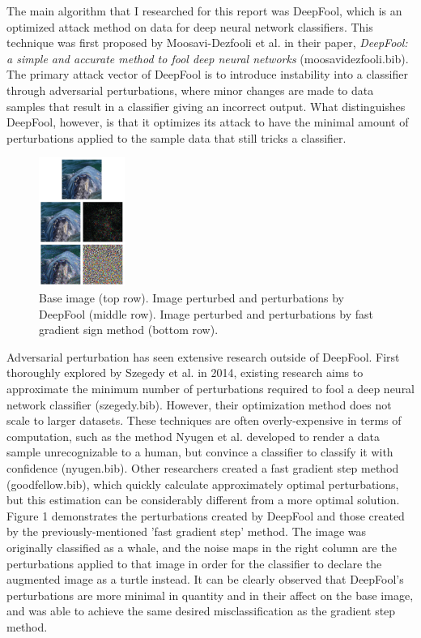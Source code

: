 \documentclass[../article.tex]{subfiles}
\begin{document}
The main algorithm that I researched for this report was DeepFool, which is an optimized attack method on data for deep neural network classifiers. This technique was first proposed by Moosavi-Dezfooli et al. in their paper, \emph{DeepFool: a simple and accurate method to fool deep neural networks} (moosavidezfooli.bib). The primary attack vector of DeepFool is to introduce instability into a classifier through adversarial perturbations, where minor changes are made to data samples that result in a classifier giving an incorrect output. What distinguishes DeepFool, however, is that it optimizes its attack to have the minimal amount of perturbations applied to the sample data that still tricks a classifier.

\begin{figure} %
	\centering
	\includegraphics[width=0.25\textwidth]{adv_pert_img.png}
	\caption{\label{fig:Figure 1}Base image (top row). Image perturbed and perturbations by DeepFool (middle row). Image perturbed and perturbations by fast gradient sign method (bottom row).}
\end{figure}

Adversarial perturbation has seen extensive research outside of DeepFool. First thoroughly explored by Szegedy et al. in 2014, existing research aims to approximate the minimum number of perturbations required to fool a deep neural network classifier (szegedy.bib). However, their optimization method does not scale to larger datasets. These techniques are often overly-expensive in terms of computation, such as the method Nyugen et al. developed to render a data sample unrecognizable to a human, but convince a classifier to classify it with confidence (nyugen.bib). Other researchers created a fast gradient step method (goodfellow.bib), which quickly calculate approximately optimal perturbations, but this estimation can be considerably different from a more optimal solution. Figure 1 demonstrates the perturbations created by DeepFool and those created by the previously-mentioned 'fast gradient step' method. The image was originally classified as a whale, and the noise maps in the right column are the perturbations applied to that image in order for the classifier to declare the augmented image as a turtle instead. It can be clearly observed that DeepFool's perturbations are more minimal in quantity and in their affect on the base image, and was able to achieve the same desired misclassification as the gradient step method.
\end{document}
